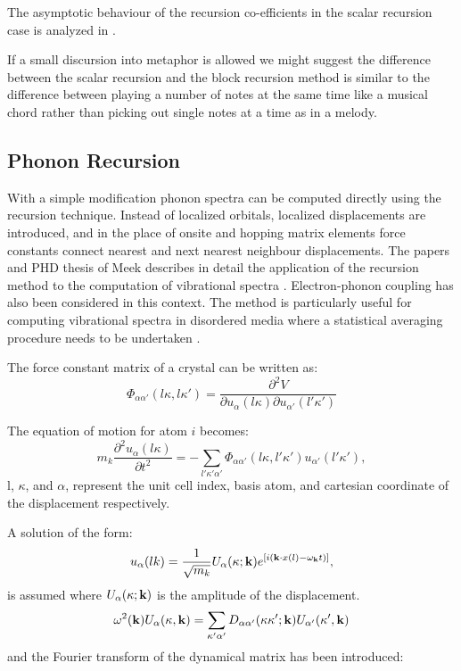 The asymptotic behaviour of the recursion co-efficients in the scalar recursion case
is analyzed in \cite{turchi82, yoshino87, yoshino88, haydock10, alhaidari18}.

If a small discursion into metaphor is allowed we might suggest 
the difference between the scalar recursion and the block recursion method is 
similar to the difference between playing a number of notes at the 
same time like a musical chord rather than picking out single notes at 
a time as in a melody.


\subsection{Phonon Recursion}
With a simple modification phonon spectra can be computed directly 
using the recursion technique. Instead of localized orbitals, localized 
displacements are introduced, and in the place of onsite and hopping
matrix elements force constants connect nearest and next 
nearest neighbour displacements. 
The papers and PHD thesis of Meek describes in detail the 
application of the recursion method to the computation of 
vibrational spectra \cite{meek76, meek78}. Electron-phonon coupling has also been
considered in this context\cite{terakura78}. The method is particularly useful for
computing vibrational spectra in disordered media 
where a statistical averaging procedure needs to be undertaken \cite{mookerjee04}.

The force constant matrix of a crystal can be written as:
%
\begin{equation}
\label{eq:forceconstant}
\Phi_{\alpha\alpha'}(l\kappa,l\kappa') = \frac{\partial^{2}V}{\partial u_{\alpha}(l\kappa) \partial u_{\alpha'}(l'\kappa')}
\end{equation}
%

The equation of motion for atom $i$ becomes:
%
\begin{equation}
m_{k} \frac{\partial^{2} u_\alpha (l\kappa)}{\partial t^{2}} = - \sum_{l'\kappa'\alpha'}
\Phi_{\alpha\alpha'}(l\kappa,l'\kappa')u_{\alpha'}(l'\kappa'),
\end{equation}
%
l, $\kappa$, and $\alpha$, represent the unit cell index, basis atom, and 
cartesian coordinate of the displacement respectively.

A solution of the form:
%
\begin{equation}
u_{\alpha}(lk) = \frac{1}{\sqrt{m_{k}}} U_{\alpha}(\kappa;{\bf k})e^{[i({\bf k}\cdot x(l) - \omega_{{\bf k}}t)]},
\end{equation}
%
is assumed where $U_{\alpha}(\kappa;{\bf k})$ is the amplitude of the displacement.
%
\begin{equation}
\omega^{2}({\bf k}) U_{\alpha}(\kappa, {\bf k}) = \sum_{\kappa'\alpha'}D_{\alpha\alpha'}(\kappa\kappa';{\bf k}) U_{\alpha'}(\kappa',{\bf k})
\end{equation}
%
and the Fourier transform of the dynamical matrix has been introduced:

